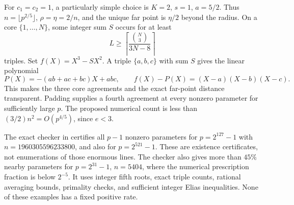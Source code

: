 For $c_1=c_2=1$, a particularly simple choice is
$K=2$, $s=1$, $a=5/2$. Thus $n=\lfloor p^{2/5}\rfloor$,
$\rho=\eta=2/n$, and the unique far point is $\eta/2$ beyond the
radius. On a core $\{1,\ldots,N\}$, some integer sum $S$ occurs for at
least
\[
 L\ge\left\lceil\frac{\binom N3}{3N-8}\right\rceil
\]
triples. Set $f(X)=X^3-SX^2$. A triple $\{a,b,c\}$ with sum $S$
gives the linear polynomial
\[
 P(X)=-(ab+ac+bc)X+abc,\qquad
 f(X)-P(X)=(X-a)(X-b)(X-c).
\]
This makes the three core agreements and the exact far-point distance
transparent. Padding supplies a fourth agreement at every nonzero
parameter for sufficiently large $p$. The proposed numerical count is
less than $(3/2)n^2=O(p^{4/5})$, since $e<3$.

The exact checker  in
 certifies all $p-1$ nonzero parameters
for $p=2^{127}-1$ with $n=1960305596233800$, and also for $p=2^{521}-1$.
These are existence certificates, not enumerations of those enormous
lines. The checker also gives more than $45\%$ nearby parameters for
$p=2^{31}-1$, $n=5404$, where the numerical prescription fraction is
below $2^{-5}$. It uses integer fifth roots, exact triple counts,
rational averaging bounds, primality checks, and sufficient integer
Elias inequalities. None of these examples has a fixed positive rate.
